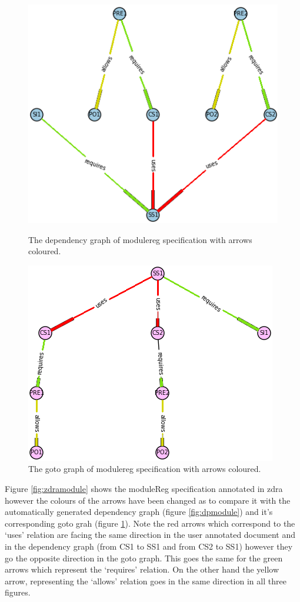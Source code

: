 \begin{figure}[H]
\centering
\begin{minipage}{0.47\textwidth}
\centering
\includegraphics[scale=0.55]{Figures/Formalising/dpmodule.png}
\caption{The dependency graph of modulereg specification with arrows coloured.  \label{fig:dpmodule}}
\end{minipage}\hfill
\begin{minipage}{0.47\textwidth}
\centering
\includegraphics[scale=0.55]{Figures/Formalising/gotomodule.png}
\caption{The goto graph of modulereg specification with arrows coloured. \label{fig:gotomodule}}
\end{minipage}
\end{figure}

Figure \ref{fig:zdramodule} shows the moduleReg specification annotated in \gls{zdra} however the colours of the arrows have been changed as to compare it with the automatically generated dependency graph (figure \ref{fig:dpmodule}) and it's corresponding goto grah (figure \ref{fig:gotomodule}). Note the red arrows which correspond to the `uses' relation are facing the same direction in the user annotated document and in the dependency graph (from CS1 to SS1 and from CS2 to SS1) however they go the opposite direction in the goto graph. This goes the same for the green arrows which represent the `requires' relation. On the other hand the yellow arrow, representing the `allows' relation goes in the same direction in all three figures.

